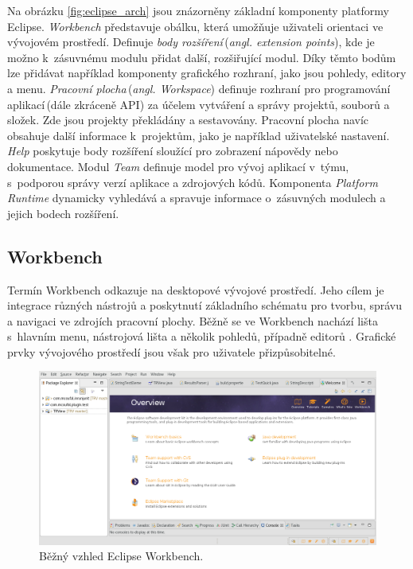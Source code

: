   Na obrázku \ref{fig:eclipse_arch} jsou znázorněny základní komponenty platformy Eclipse. \emph{Workbench} představuje obálku, která umožňuje uživateli orientaci ve vývojovém prostředí. Definuje \emph{body rozšíření}\,(\emph{angl. extension points}), kde je možno k~zásuvnému modulu přidat další, rozšiřující modul. Díky těmto bodům lze přidávat například komponenty grafického rozhraní, jako jsou pohledy, editory a menu. \emph{Pracovní plocha}\,(\emph{angl. Workspace}) definuje rozhraní pro programování aplikací\,(dále zkráceně API) za účelem vytváření a správy projektů, souborů a složek. Zde jsou projekty překládány a sestavovány. Pracovní plocha navíc obsahuje další informace k~projektům, jako je například uživatelské nastavení. \emph{Help} poskytuje body rozšíření sloužící pro zobrazení nápovědy nebo dokumentace. Modul \emph{Team} definuje model pro vývoj aplikací v~týmu, s~podporou správy verzí aplikace a zdrojových kódů. Komponenta \emph{Platform Runtime} dynamicky vyhledává a spravuje informace o~zásuvných modulech a jejich bodech rozšíření. 

    \subsection{Workbench}
    Termín Workbench odkazuje na desktopové vývojové prostředí. Jeho cílem je integrace různých nástrojů a poskytnutí základního schématu pro tvorbu, správu a navigaci ve zdrojích pracovní plochy. Běžně se ve Workbench nachází lišta s~hlavním menu, nástrojová lišta a několik pohledů, případně editorů \cite{eclipse-workbench}. Grafické prvky vývojového prostředí jsou však pro uživatele přizpůsobitelné.

    \begin{figure}[h]
      \includegraphics[width=\textwidth, keepaspectratio, center]{obrazky-figures/eclipse_workbench.png}
      \caption{Běžný vzhled Eclipse Workbench.}
      \label{fig:eclipse_workbench}
    \end{figure}

